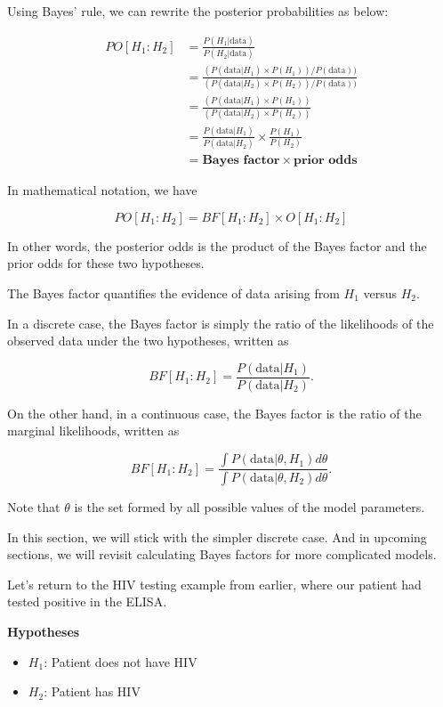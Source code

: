 \documentclass[]{book}
\providecommand{\tightlist}{%
  \setlength{\itemsep}{0pt}\setlength{\parskip}{0pt}}
\theoremstyle{definition}
\theoremstyle{definition}
\theoremstyle{definition}
\theoremstyle{remark}
\begin{document}
Using Bayes' rule, we can rewrite the posterior probabilities as below:

\[\begin{aligned}
PO[H_1:H_2] &= \frac{P(H_1|\text{data})}{P(H_2|\text{data})} \\
&= \frac{(P(\text{data}|H_1) \times P(H_1)) / P(\text{data}))}{(P(\text{data}|H_2) \times P(H_2)) / P(\text{data}))} \\
&= \frac{(P(\text{data}|H_1) \times P(H_1))}{(P(\text{data}|H_2) \times P(H_2))} \\
&= \boxed{\frac{P(\text{data}|H_1)}{P(\text{data}|H_2)}} \times \boxed{\frac{P(H_1)}{P(H_2)}} \\
&= \textbf{Bayes factor} \times \textbf{prior odds}
\end{aligned}\]

In mathematical notation, we have

\[PO[H_1:H_2] = BF[H_1:H_2] \times O[H_1:H_2]\]

In other words, the posterior odds is the product of the Bayes factor
and the prior odds for these two hypotheses.

The Bayes factor quantifies the evidence of data arising from \(H_1\)
versus \(H_2\).

In a discrete case, the Bayes factor is simply the ratio of the
likelihoods of the observed data under the two hypotheses, written as

\[BF[H_1:H_2] = \frac{P(\text{data}|H_1)}{P(\text{data}|H_2)}.\]

On the other hand, in a continuous case, the Bayes factor is the ratio
of the marginal likelihoods, written as

\[BF[H_1:H_2] = \frac{\int P(\text{data}|\theta,H_1)d\theta}{\int P(\text{data}|\theta,H_2)d\theta}.\]

Note that \(\theta\) is the set formed by all possible values of the
model parameters.

In this section, we will stick with the simpler discrete case. And in
upcoming sections, we will revisit calculating Bayes factors for more
complicated models.

Let's return to the HIV testing example from earlier, where our patient
had tested positive in the ELISA.

\textbf{Hypotheses}

\begin{itemize}
\tightlist
\item
  \(H_1\): Patient does not have HIV
\item
  \(H_2\): Patient has HIV
\end{itemize}
\end{document}
